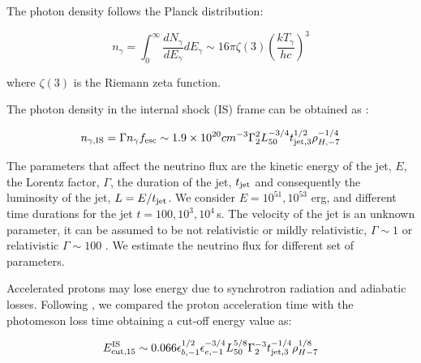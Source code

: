 \documentclass[twocolumn]{aastex631}
\begin{document}
{The photon density  follows the Planck distribution:

\begin{equation}
    n_{\gamma}= \int_0^\infty \frac{dN_{\gamma}}{dE_{\gamma}} dE_{\gamma} \sim 16 \pi \zeta(3) (\frac{kT_{\gamma}}{h c})^3
\end{equation}

\noindent

where $\zeta(3)$ is the Riemann zeta function.



The photon density in the internal shock (IS) frame can be obtained as \cite{Fasano2021}:

\begin{equation}
 n_{\gamma,\rm IS}= \Gamma n_{\gamma} f_{\rm esc} \sim 1.9 \times 10^{20} cm^{-3} \Gamma ^2_2 L^{-3/4}_{50} t^{1/2}_{\rm jet,3} \rho^{-1/4}_{H,-7}
\end{equation}

The parameters that affect the neutrino flux are the kinetic energy of the jet, $E$, the Lorentz factor, $\Gamma$, the duration of the jet, $t_{\rm jet}$ and consequently the luminosity of the jet, $L=E/t_{\rm jet}$.  
We consider $E=10^{51},10^{53}$ erg, and different time durations for the jet \citep{He2018} $t=100,10^3, 10^{4}$\,s. 
The velocity of the jet is an unknown parameter, it can be assumed to be  not relativistic or mildly relativistic, $\Gamma\sim 1$ \citep{Izzo2019,Soker22} or relativistic $\Gamma\sim 100$ \citep{Fasano2021}. 
We estimate the neutrino flux for different set of parameters.

Accelerated protons may lose energy due to synchrotron radiation and adiabatic losses. Following \cite{Fasano2021}, we compared the proton acceleration time with the photomeson loss time obtaining a cut-off energy value as:

\begin{equation}
    E_{\rm cut,15}^{\rm IS} \sim 0.066 \epsilon_{b,-1}^{1/2} \epsilon_{e,-1}^{-3/4} L_{50}^{5/8} \Gamma_2^{-3} t_{\rm jet,3}^{-1/4} \rho_{H-7}^{1/8}
\end{equation}

}
\end{document}
